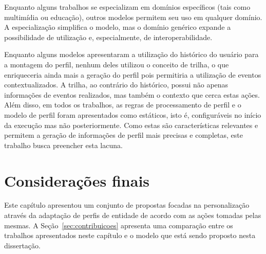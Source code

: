 Enquanto alguns trabalhos se especializam em domínios específicos (tais como multimídia ou educação), outros modelos permitem seu uso em qualquer domínio. A especialização simplifica o modelo, mas o domínio genérico expande a possibilidade de utilização e, especialmente, de interoperabilidade.

Enquanto alguns modelos apresentaram a utilização do histórico do usuário para a montagem do perfil, nenhum deles utilizou o conceito de trilha, o que enriqueceria ainda mais a geração do perfil pois permitiria a utilização de eventos contextualizados. A trilha, ao contrário do histórico, possui não apenas informações de eventos realizados, mas também o contexto que cerca estas ações. Além disso, em todos os trabalhos, as regras de processamento de perfil e o modelo de perfil foram apresentados como estáticos, isto é, configuráveis no início da execução mas não posteriormente. Como estas são características relevantes e permitem a geração de informações de perfil mais precisas e completas, este trabalho busca preencher esta lacuna.


\section{Considerações finais}

Este capítulo apresentou um conjunto de propostas focadas na personalização através da adaptação de perfis de entidade de acordo com as ações tomadas pelas mesmas.  A Seção~\ref{sec:contribuicoes} apresenta uma comparação entre os trabalhos apresentados neste capítulo e o modelo que está sendo proposto nesta dissertação.



%

